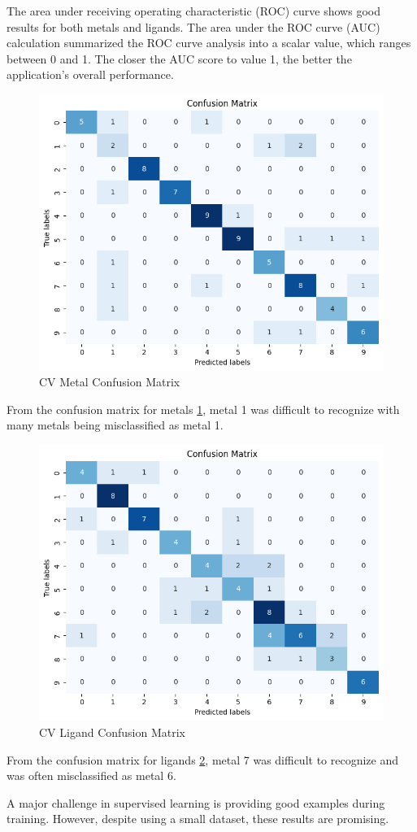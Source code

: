 The area under receiving operating characteristic (ROC) curve shows good results for both metals and ligands. The area under the ROC curve (AUC) calculation summarized the ROC curve analysis into a scalar value, which ranges between 0 and 1. The closer the AUC score to value 1, the better the application’s overall performance.
\begin{figure}[h!]
  \centering
    \includegraphics[width=1.0\textwidth]{figures/cv_metal_matrix.png}
    \caption{CV Metal Confusion Matrix}
    \label{cv_metal_matrix}
\end{figure}
From the confusion matrix for metals \ref{cv_metal_matrix}, metal 1 was difficult to recognize with many metals being misclassified as metal 1. 
\begin{figure}[h!]
  \centering
    \includegraphics[width=1.0\textwidth]{figures/cv_ligand_matrix.png}
    \caption{CV Ligand Confusion Matrix}
    \label{cv_ligand_matrix}
\end{figure}
From the confusion matrix for ligands \ref{cv_ligand_matrix}, metal 7 was difficult to recognize and was often misclassified as metal 6. 

A major challenge in supervised learning is providing good examples during training. However, despite using a small dataset, these results are promising. 

